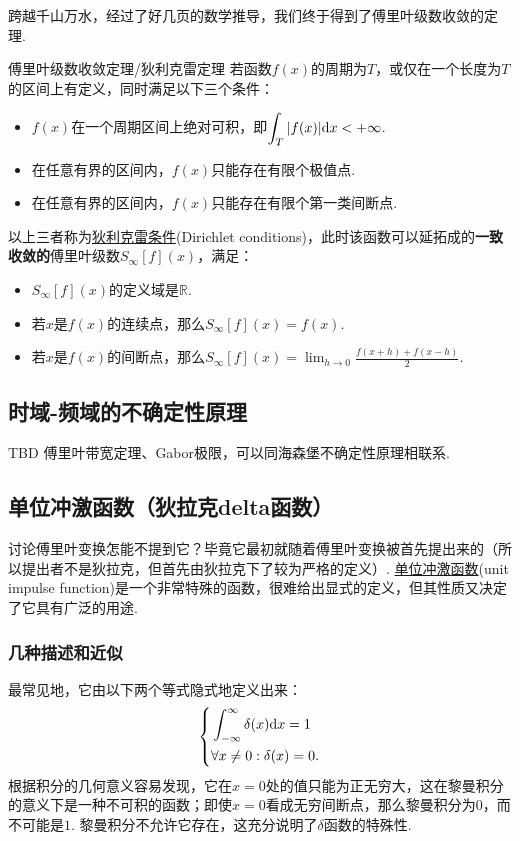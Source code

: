 跨越千山万水，经过了好几页的数学推导，我们终于得到了傅里叶级数收敛的定理.
\begin{theorem}{傅里叶级数收敛定理/狄利克雷定理}
    若函数\(f(x)\)的周期为\(T\)，或仅在一个长度为\(T\)的区间上有定义，同时满足以下三个条件：
    \begin{itemize}
        \item [(1)] \(f(x)\)在一个周期区间上绝对可积，即\(\displaystyle{\int_{T} |f(x)|{\rm d}x < +\infty}\).
        \item [(2)] 在任意有界的区间内，\(f(x)\)只能存在有限个极值点.
        \item [(3)] 在任意有界的区间内，\(f(x)\)只能存在有限个第一类间断点.
    \end{itemize}
    以上三者称为\uline{狄利克雷条件}(Dirichlet conditions)，此时该函数可以延拓成的\textbf{一致收敛的}傅里叶级数\(S_{\infty}[f](x)\)，满足：
    \begin{itemize}
        \item [(1)] \(S_{\infty}[f](x)\)的定义域是\(\mathbb{R}\).
        \item [(2)] 若\(x\)是\(f(x)\)的连续点，那么\(S_{\infty}[f](x)=f(x)\).
        \item [(3)] 若\(x\)是\(f(x)\)的间断点，那么\(\displaystyle{S_{\infty}[f](x)=\lim_{h \to 0}\frac{f(x+h)+f(x-h)}{2}}\).
    \end{itemize}
\end{theorem}


\subsection{时域-频域的不确定性原理}
TBD
傅里叶带宽定理、Gabor极限，可以同海森堡不确定性原理相联系.

\subsection{单位冲激函数（狄拉克delta函数）}

讨论傅里叶变换怎能不提到它？毕竟它最初就随着傅里叶变换被首先提出来的（所以提出者不是狄拉克，但首先由狄拉克下了较为严格的定义）. \uline{单位冲激函数}(unit impulse function)是一个非常特殊的函数，很难给出显式的定义，但其性质又决定了它具有广泛的用途.

\subsubsection{几种描述和近似}

最常见地，它由以下两个等式隐式地定义出来：
\[\left\{\begin{aligned} & \int_{-\infty}^{\infty}\delta(x){\rm d}x=1 \\ & \forall x \neq 0: \delta(x)=0. \end{aligned}\right.\]
根据积分的几何意义容易发现，它在\(x=0\)处的值只能为正无穷大，这在黎曼积分的意义下是一种不可积的函数；即使\(x=0\)看成无穷间断点，那么黎曼积分为\(0\)，而不可能是\(1\). 黎曼积分不允许它存在，这充分说明了\(\delta\)函数的特殊性.

